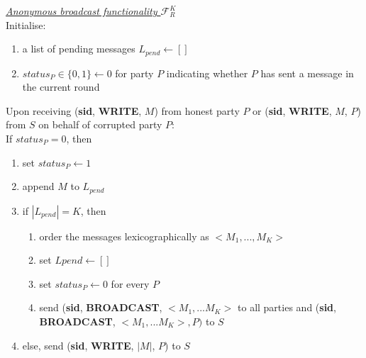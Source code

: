 \begin{tcolorbox}[colback=white, arc=5pt]
\noindent\emph{\underline{Anonymous broadcast functionality $\mathcal{F}_R^K$}}\\[5pt]
 Initialise:
 \begin{enumerate}
     \item a list of pending messages $L_{pend} \leftarrow []$
     \item $status_P\in\{0,1\}\leftarrow 0$ for party $P$ indicating whether $P$ has sent a message in the current round
 \end{enumerate}
 
 
\extitem Upon receiving (\textbf{sid}, \textbf{WRITE}, $M$) from honest party $P$ or (\textbf{sid}, \textbf{WRITE}, $M$, $P$) from $S$ on behalf of corrupted party $P$:\\
If $status_P=0$, then
\begin{enumerate}
    \item set $status_P\leftarrow 1$
    \item append $M$ to $L_{pend}$
    \item if $|L_{pend}|=K$, then
    \begin{enumerate}
        \item order the messages lexicographically as $<M_1,...,M_K>$
        \item set $L{pend}\leftarrow []$
        \item set $status_P\leftarrow 0$ for every $P$
        \item send (\textbf{sid}, \textbf{BROADCAST}, $<M_1,...M_K>$ to all parties and (\textbf{sid}, \textbf{BROADCAST}, $<M_1,...M_K>, P)$ to $S$
    \end{enumerate}
    \item else, send (\textbf{sid}, \textbf{WRITE}, $|M|$, $P$) to $S$
\end{enumerate}





\end{tcolorbox}
\label{fig:riposte_functionality}